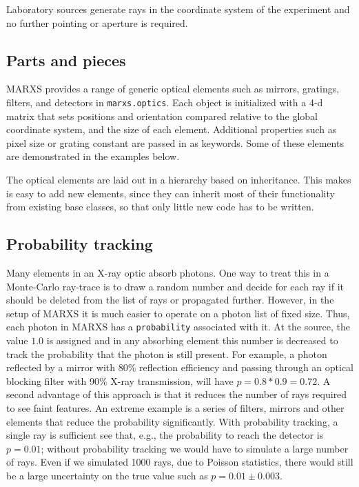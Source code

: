 \documentclass[twocolumn]{aastex61}
\begin{document}
Laboratory sources generate rays in the coordinate system of the experiment and
no further pointing or aperture is required.


\subsection{Parts and pieces}
MARXS provides a range of generic optical elements such as mirrors, gratings,
filters, and detectors in \texttt{marxs.optics}. Each object is initialized
with a 4-d matrix that sets positions and orientation compared relative to the global coordinate system, and the size of
each element. Additional properties such as pixel size or grating constant are
passed in as keywords. Some of these elements are demonstrated in the examples
below.

The optical elements are laid out in a hierarchy based on inheritance. This makes
is easy to add new elements, since they can inherit most of their functionality
from existing base classes, so that only little new code has to be written.


\subsection{Probability tracking}
Many elements in an X-ray optic absorb photons. One way to treat this in a
Monte-Carlo ray-trace is to draw a random number and decide for each ray if it
should be deleted from the list of rays or propagated further. However, in the
setup of MARXS it is much easier to operate on a photon list of fixed
size. Thus, each photon in MARXS has a \texttt{probability} associated with
it. At the source, the value $1.0$ is assigned and in any absorbing element
this number is decreased to track the probability that the photon is still
present. For example, a photon reflected by a mirror with 80\% reflection
efficiency and passing through an optical blocking filter with 90\% X-ray
transmission, will have $p=0.8*0.9 = 0.72$. A second advantage of this approach
is that it reduces the number of rays required to see faint features. An
extreme example is a series of filters, mirrors and other elements that reduce
the probability significantly. With probability tracking, a single ray is
sufficient see that, e.g., the probability to reach the detector is $p=0.01$;
without probability tracking we would have to simulate a large number of
rays. Even if we simulated 1000 rays, due to Poisson statistics, there would
still be a large uncertainty on the true value such as $p=0.01\pm0.003$.
\end{document}
